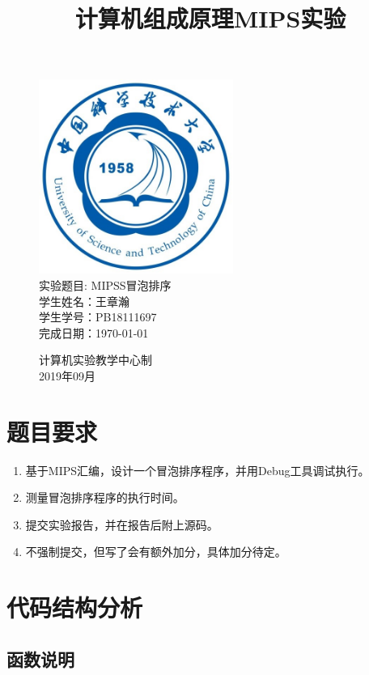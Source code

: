 \documentclass[UTF8]{article}
\title{计算机组成原理MIPS实验}
\date{}
\begin{document}
\maketitle
\begin{figure}[H]
	\centering
	\includegraphics[width=2.5in]{xiaohui.png}\vspace{0.5cm}\\
	\large{
		实验题目: MIPSS冒泡排序\\
		学生姓名：王章瀚\\
		学生学号：PB18111697\\
		完成日期：\today\\
	}\vspace{2cm}
	
	\large{计算机实验教学中心制\\2019年09月\\}
	\thispagestyle{empty}
	\clearpage  %
\end{figure}
\newpage

\section{题目要求}
\begin{enumerate}
	\item 基于MIPS汇编，设计一个冒泡排序程序，并用Debug工具调试执行。
	\item 测量冒泡排序程序的执行时间。
	\item 提交实验报告，并在报告后附上源码。
	\item 不强制提交，但写了会有额外加分，具体加分待定。
\end{enumerate}

\section{代码结构分析}
\subsection{函数说明}
\end{document}
